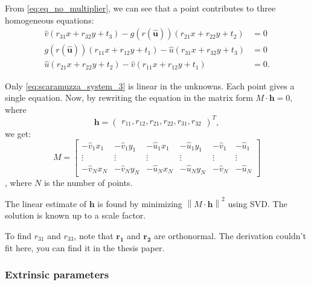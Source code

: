\documentclass[
  twocolumn,
]{article} %
\begin{document}
From \cref{eq:eq_no_multiplier}, we can see that a point contributes to three
homogeneous equations:
\begin{align}
	\widehat{v} (r_{31}x + r_{32} y + t_3) -
	g(r(\mathbf{\widehat{u}})) (r_{21}x + r_{22}y + t_2 ) & = 0
	\label{eq:scaramuzza_system_1}                              \\
	g(r(\mathbf{\widehat{u}})) (r_{11}x + r_{12}y + t_1) -
	\widehat{u} (r_{31}x + r_{32} y + t_3)                & = 0
	\label{eq:scaramuzza_system_2}                              \\
	\widehat{u} (r_{21}x + r_{22}y + t_2 ) -
	\widehat{v} (r_{11}x + r_{12}y + t_1)                 & = 0
	\label{eq:scaramuzza_system_3}.
\end{align}

Only \cref{eq:scaramuzza_system_3} is linear in the unknowns. Each point gives a
single equation. Now, by rewriting the equation in the matrix form
\(M \cdot \mathbf{h} = 0\), where
\[
	\mathbf{h} = \begin{pmatrix}
		r_{11}, r_{12}, r_{21}, r_{22}, r_{31}, r_{32}
	\end{pmatrix}^{T},
\]
we get:
\begin{equation}
	M = \begin{bmatrix}
		-\widehat{v}_1 x_1 & -\widehat{v}_1 y_1 & -\widehat{u}_1 x_1 & -\widehat{u}_1 y_1 & -\widehat{v}_1 & -\widehat{u}_1 \\
		\vdots             & \vdots             & \vdots             & \vdots             & \vdots         & \vdots         \\
		-\widehat{v}_N x_N & -\widehat{v}_N y_N & -\widehat{u}_N x_N & -\widehat{u}_N y_N & -\widehat{v}_N & -\widehat{u}_N
	\end{bmatrix}
\end{equation}, where \(N\) is the number of points.

The linear estimate of \(\mathbf{h}\) is found by minimizing \(\left\lVert M \cdot
\mathbf{h} \right\rVert ^{2}\) using SVD. The solution is known up to a scale factor.

To find \(r_{31}\) and \(r_{33}\), note that \(\mathbf{r_1}\) and
\(\mathbf{r_2}\) are orthonormal. The derivation couldn't fit here, you can find
it in the thesis paper.

\subsubsection{Extrinsic parameters}\label{subsub:extrinsic_parameters}
\end{document}
